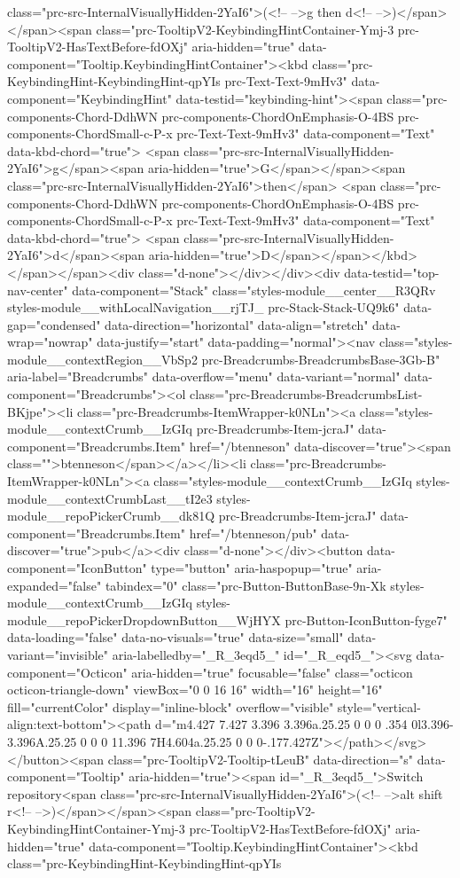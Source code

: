 {{{class="prc-src-InternalVisuallyHidden-2YaI6">(<!-- -->g then d<!-- -->)</span></span><span class="prc-TooltipV2-KeybindingHintContainer-Ymj-3 prc-TooltipV2-HasTextBefore-fdOXj" aria-hidden="true" data-component="Tooltip.KeybindingHintContainer"><kbd class="prc-KeybindingHint-KeybindingHint-qpYIs prc-Text-Text-9mHv3" data-component="KeybindingHint" data-testid="keybinding-hint"><span class="prc-components-Chord-DdhWN prc-components-ChordOnEmphasis-O-4BS prc-components-ChordSmall-c-P-x prc-Text-Text-9mHv3" data-component="Text" data-kbd-chord="true"> <span class="prc-src-InternalVisuallyHidden-2YaI6">g</span><span aria-hidden="true">G</span></span><span class="prc-src-InternalVisuallyHidden-2YaI6">then</span> <span class="prc-components-Chord-DdhWN prc-components-ChordOnEmphasis-O-4BS prc-components-ChordSmall-c-P-x prc-Text-Text-9mHv3" data-component="Text" data-kbd-chord="true"> <span class="prc-src-InternalVisuallyHidden-2YaI6">d</span><span aria-hidden="true">D</span></span></kbd></span></span><div class="d-none"></div></div><div data-testid="top-nav-center" data-component="Stack" class="styles-module__center__R3QRv styles-module__withLocalNavigation__rjTJ_ prc-Stack-Stack-UQ9k6" data-gap="condensed" data-direction="horizontal" data-align="stretch" data-wrap="nowrap" data-justify="start" data-padding="normal"><nav class="styles-module__contextRegion__VbSp2 prc-Breadcrumbs-BreadcrumbsBase-3Gb-B" aria-label="Breadcrumbs" data-overflow="menu" data-variant="normal" data-component="Breadcrumbs"><ol class="prc-Breadcrumbs-BreadcrumbsList-BKjpe"><li class="prc-Breadcrumbs-ItemWrapper-k0NLn"><a class="styles-module__contextCrumb__IzGIq prc-Breadcrumbs-Item-jcraJ" data-component="Breadcrumbs.Item" href="/btenneson" data-discover="true"><span class="">btenneson</span></a></li><li class="prc-Breadcrumbs-ItemWrapper-k0NLn"><a class="styles-module__contextCrumb__IzGIq styles-module__contextCrumbLast__tI2e3 styles-module__repoPickerCrumb__dk81Q prc-Breadcrumbs-Item-jcraJ" data-component="Breadcrumbs.Item" href="/btenneson/pub" data-discover="true">pub</a><div class="d-none"></div><button data-component="IconButton" type="button" aria-haspopup="true" aria-expanded="false" tabindex="0" class="prc-Button-ButtonBase-9n-Xk styles-module__contextCrumb__IzGIq styles-module__repoPickerDropdownButton__WjHYX prc-Button-IconButton-fyge7" data-loading="false" data-no-visuals="true" data-size="small" data-variant="invisible" aria-labelledby="_R_3eqd5_" id="_R_eqd5_"><svg data-component="Octicon" aria-hidden="true" focusable="false" class="octicon octicon-triangle-down" viewBox="0 0 16 16" width="16" height="16" fill="currentColor" display="inline-block" overflow="visible" style="vertical-align:text-bottom"><path d="m4.427 7.427 3.396 3.396a.25.25 0 0 0 .354 0l3.396-3.396A.25.25 0 0 0 11.396 7H4.604a.25.25 0 0 0-.177.427Z"></path></svg></button><span class="prc-TooltipV2-Tooltip-tLeuB" data-direction="s" data-component="Tooltip" aria-hidden="true"><span id="_R_3eqd5_">Switch repository<span class="prc-src-InternalVisuallyHidden-2YaI6">(<!-- -->alt shift r<!-- -->)</span></span><span class="prc-TooltipV2-KeybindingHintContainer-Ymj-3 prc-TooltipV2-HasTextBefore-fdOXj" aria-hidden="true" data-component="Tooltip.KeybindingHintContainer"><kbd class="prc-KeybindingHint-KeybindingHint-qpYIs }}}
